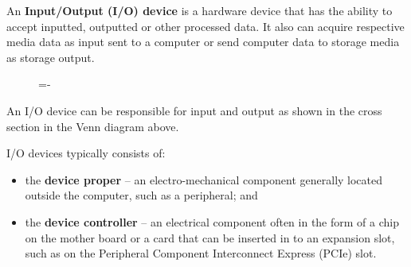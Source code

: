 \documentclass[a4paper]{systems-software}
\begin{document}
An \textbf{Input/Output (I/O) device} is a hardware device that has the ability to accept inputted, outputted or other processed data. It also can acquire respective media data as input sent to a computer or send computer data to storage media as storage output.

\begin{figure}[H]
  \lineskip=-\fboxrule
\end{figure}

An I/O device can be responsible for input and output as shown in the cross section in the Venn diagram above.

I/O devices typically consists of:
\begin{itemize}
	\item the \textbf{device proper} -- an electro-mechanical component generally located outside the computer, such as a peripheral; and
	\item the \textbf{device controller} -- an electrical component often in the form of a chip on the mother board or a card that can be inserted in to an expansion slot, such as on the Peripheral Component Interconnect Express (PCIe) slot.
\end{itemize}
\end{document}
